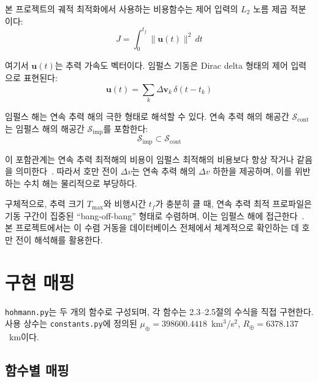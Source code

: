 \documentclass[11pt]{article}
\begin{document}
본 프로젝트의 궤적 최적화에서 사용하는 비용함수는 제어 입력의 $L_2$ 노름 제곱 적분이다:
\[
J = \int_0^{t_f} \|\mathbf{u}(t)\|^2 \, dt
\]

여기서 $\mathbf{u}(t)$는 추력 가속도 벡터이다. 임펄스 기동은 Dirac delta 형태의 제어 입력으로 표현된다:
\[
\mathbf{u}(t) = \sum_{k} \Delta \mathbf{v}_k \, \delta(t - t_k)
\]

임펄스 해는 연속 추력 해의 극한 형태로 해석할 수 있다. 연속 추력 해의 해공간 $\mathcal{S}_{\text{cont}}$는 임펄스 해의 해공간 $\mathcal{S}_{\text{imp}}$를 포함한다:
\[
\mathcal{S}_{\text{imp}} \subset \mathcal{S}_{\text{cont}}
\]

이 포함관계는 연속 추력 최적해의 비용이 임펄스 최적해의 비용보다 항상 작거나 같음을 의미한다~\cite{Taheri2018, Prussing2010}. 따라서 호만 전이 $\Delta v$는 연속 추력 해의 $\Delta v$ 하한을 제공하며, 이를 위반하는 수치 해는 물리적으로 부당하다.

구체적으로, 추력 크기 $T_{\max}$와 비행시간 $t_f$가 충분히 클 때, 연속 추력 최적 프로파일은 기동 구간이 집중된 ``bang-off-bang'' 형태로 수렴하며, 이는 임펄스 해에 접근한다~\cite{Prussing2010}. 본 프로젝트에서는 이 수렴 거동을 데이터베이스 전체에서 체계적으로 확인하는 데 호만 전이 해석해를 활용한다.

\section{구현 매핑}

\texttt{hohmann.py}는 두 개의 함수로 구성되며, 각 함수는 2.3--2.5절의 수식을 직접 구현한다. 사용 상수는 \texttt{constants.py}에 정의된 $\mu_\oplus = 398600.4418$~km$^3$/s$^2$, $R_\oplus = 6378.137$~km이다.

\subsection{함수별 매핑}
\end{document}
